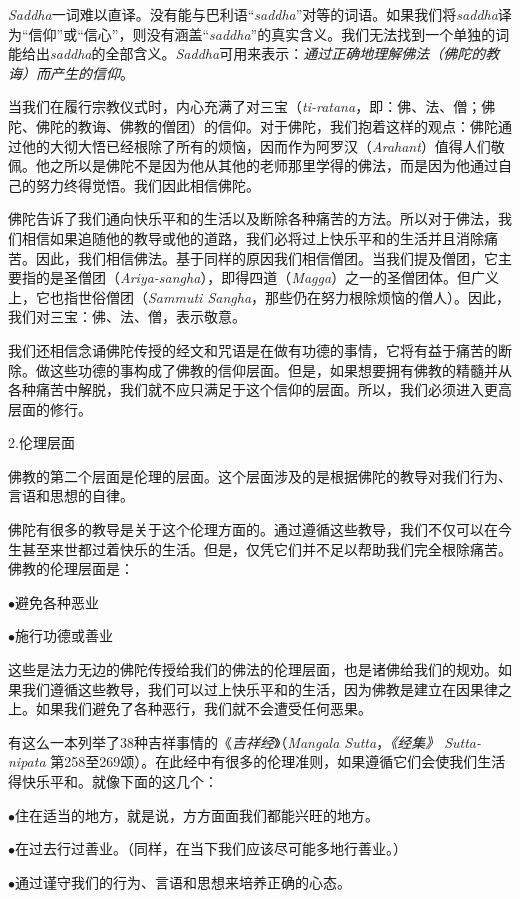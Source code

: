 {\it Saddha}一词难以直译。没有能与巴利语“{\it saddha}”对等的词语。如果我们将{\it saddha}译为“信仰”或“信心”，则没有涵盖“{\it saddha}”的真实含义。我们无法找到一个单独的词能给出{\it saddha}的全部含义。{\it Saddha}可用来表示：{\it 通过正确地\1理解佛法（佛陀的教诲）而产生的信仰}。

当我们在履行宗教仪式时，内心充满了对三宝（{\it ti-ratana}，即：佛、法、僧；佛陀、佛陀的教诲、佛教的僧团）的信仰。对于佛陀，我们抱着这样的观点：佛陀通过他的大彻大悟已经根除了所有的烦恼，因而作为阿罗汉（{\it Arahant}）值得人们敬佩。他之所以是佛陀不是因为他从其他的老师那里学得的佛法，而是因为他通过自己的努力终得觉悟。我们因此相信佛陀。

佛陀告诉了我们通向快乐平和的生活以及断除各种痛苦的方法。所以对于佛法，我们相信如果追随他的教导或他的道路，我们必将过上快乐平和的生活并且消除痛苦。因此，我们相信佛法。基于同样的原因我们相信僧团。当我们提及僧团，它主要指的是圣僧团（{\it Ariya-sangha}），即得四道（{\it Magga}）之一的圣僧团体。但广义上，它也指世俗僧团（{\it Sammuti Sangha}，那些仍在努力根除烦恼的僧人）。因此，我们对三宝：佛、法、僧，表示敬意。

我们还相信念诵佛陀传授的经文和咒语是在做有功德的事情，它将有益于痛苦的断除。做这些功德的事构成了佛教的信仰层面。但是，如果想要拥有佛教的精髓并\1从各种痛苦中解脱，我们就不应只满足于这个信仰的层面。所以，我们必须进入更高层面的修行。

\sssubsectnon 2.伦理层面

佛教的第二个层面是伦理的层面。这个层面涉及的是根据佛陀的教导对我们行为、言语和思想的自律。

佛陀有很多的教导是关于这个伦理方面的。通过遵循这些教导，我们不仅可以在今生甚至来世都过着快乐的生活。但是，仅凭它们并不足以帮助我们完全根除痛苦。佛教的伦理层面是：

{
\leftskip=1.2pc
\item{$\bullet$}避免各种恶业
\item{$\bullet$}施行功德或善业

}

这些是法力无边的佛陀传授给我们的佛法的伦理层面，也是诸佛给我们的规劝。如果我们遵循这些教导，我们可以过上快乐平和的生活，因为佛教是建立在因果律之上。如果我们避免了各种恶行，我们就不会遭受任何恶果。

有这么一本列举了38种吉祥事情的《{\it 吉祥经}》（{\it Mangala Sutta}，{\it 《经集》 Sutta-nipata } 第258至269颂）。在此经中有很多的伦理准则，如果遵循它们会使我们生活得快乐平和。就像下面的这几个：

{
\leftskip=1.2pc
\item{$\bullet$}住在适当的地方，就是说，方方面面我们都能兴旺的地方。
\item{$\bullet$}在过去行过善业。（同样，在当下我们应该尽可能多地行善业。）
\item{$\bullet$}通过谨守我们的行为、言语和思想来培养正确的心态。

}

